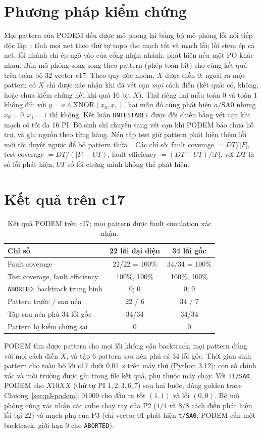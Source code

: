 \section{Phương pháp kiểm chứng}
\label{sec:p6-kiem-chung}
Mọi pattern của PODEM đều được mô phỏng lại bằng bộ mô phỏng lỗi nối tiếp độc
lập~\cite[Ch.~3]{p1_wang2006}: tính mọi net theo thứ tự topo cho mạch tốt và
mạch lỗi; lỗi stem ép cả net, lỗi nhánh chỉ ép ngõ vào của cổng nhận nhánh;
phát hiện nếu một PO khác nhau. Bản mô phỏng song song theo pattern (phép toán
bit) cho cùng kết quả trên toàn bộ 32 vector c17. Theo quy ước nhóm, $X$ được
điền $0$; ngoài ra một pattern có $X$ chỉ được xác nhận khi đã vét cạn
\emph{mọi} cách điền (kết quả: có, không, hoặc chưa kiểm chứng hết khi quá 16
bit $X$). Thử riêng hai mẫu toàn $0$ và toàn $1$ không đủ: với
$y=a\land\mathrm{XNOR}(x_0,x_1)$, hai mẫu đó cùng phát hiện $a/\mathrm{SA0}$
nhưng $x_0=0,x_1=1$ thì không. Kết luận \texttt{UNTESTABLE} được đối chiếu
bằng vét cạn khi mạch có tối đa 16 PI. Bộ sinh chỉ chuyển sang vét cạn khi
PODEM báo chưa hỗ trợ, và ghi nguồn theo từng hàng. Nén tập test giữ pattern
phát hiện thêm lỗi mới rồi duyệt ngược để bỏ pattern thừa~\cite[Ch.~4]{p1_wang2006}.
Các chỉ số: fault coverage $=DT/|F|$, test coverage $=DT/(|F|-UT)$, fault
efficiency $=(DT+UT)/|F|$, với $DT$ là số lỗi phát hiện, $UT$ số lỗi chứng minh
không thể phát hiện.

\section{Kết quả trên c17}
\label{sec:p6-c17}
\begin{table}[H]
\centering
\caption{Kết quả PODEM trên c17; mọi pattern được fault simulation xác nhận.}
\label{tab:p6-c17}
\begin{tabular}{@{}lcc@{}}
\toprule
Chỉ số & 22 lỗi đại diện & 34 lỗi gốc\\
\midrule
Fault coverage & 22/22 = 100\% & 34/34 = 100\%\\
Test coverage, fault efficiency & 100\%, 100\% & 100\%, 100\%\\
\texttt{ABORTED}; backtrack trung bình & 0; 0 & 0; 0\\
Pattern trước / sau nén & 22 / 6 & 34 / 7\\
Tập sau nén phủ 34 lỗi gốc & 34/34 & 34/34\\
Pattern bị kiểm chứng sai & 0 & 0\\
\bottomrule
\end{tabular}
\end{table}
PODEM tìm được pattern cho mọi lỗi không cần backtrack, mọi pattern đúng với
mọi cách điền $X$, và tập 6 pattern sau nén phủ cả 34 lỗi gốc. Thời gian sinh
pattern cho toàn bộ lỗi c17 dưới 0{,}01~s trên máy thử (Python 3.12); con số
chính xác và môi trường được ghi trong file kết quả, phụ thuộc máy chạy. Với
\texttt{11/SA0}, PODEM cho $X10XX$ (thứ tự PI $1,2,3,6,7$) sau hai bước, đúng
golden trace Chương~\ref{sec:p3-podem}; $01000$ cho đầu ra tốt $(1,1)$ và lỗi
$(0,0)$. Bộ mô phỏng cũng xác nhận các cube chạy tay của P2 ($4/4$ và $8/8$
cách điền phát hiện lỗi tại 22) và mạch phụ của P3 (chỉ vector $01$ phát hiện
\texttt{t/SA0}; PODEM cần một backtrack, giới hạn 0 cho \texttt{ABORTED}).

